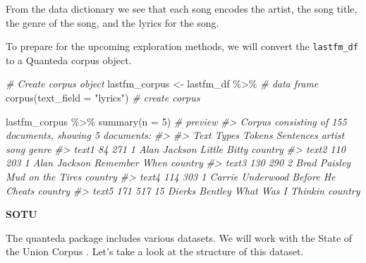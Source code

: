 \documentclass[
]{article}
\newenvironment{Shaded}{\begin{snugshade}}{\end{snugshade}}
\newcommand{\AttributeTok}[1]{\textcolor[rgb]{0.77,0.63,0.00}{#1}}
\newcommand{\CommentTok}[1]{\textcolor[rgb]{0.56,0.35,0.01}{\textit{#1}}}
\newcommand{\DecValTok}[1]{\textcolor[rgb]{0.00,0.00,0.81}{#1}}
\newcommand{\FunctionTok}[1]{\textcolor[rgb]{0.00,0.00,0.00}{#1}}
\newcommand{\NormalTok}[1]{#1}
\newcommand{\OtherTok}[1]{\textcolor[rgb]{0.56,0.35,0.01}{#1}}
\newcommand{\SpecialCharTok}[1]{\textcolor[rgb]{0.00,0.00,0.00}{#1}}
\newcommand{\StringTok}[1]{\textcolor[rgb]{0.31,0.60,0.02}{#1}}
\begin{document}
From the data dictionary we see that each song encodes the artist, the song title, the genre of the song, and the lyrics for the song.

To prepare for the upcoming exploration methods, we will convert the \texttt{lastfm\_df} to a Quanteda corpus object.

\begin{Shaded}
\begin{Highlighting}[]
\CommentTok{\# Create corpus object}
\NormalTok{lastfm\_corpus }\OtherTok{\textless{}{-}} 
\NormalTok{  lastfm\_df }\SpecialCharTok{\%\textgreater{}\%} \CommentTok{\# data frame}
  \FunctionTok{corpus}\NormalTok{(}\AttributeTok{text\_field =} \StringTok{"lyrics"}\NormalTok{) }\CommentTok{\# create corpus}

\NormalTok{lastfm\_corpus }\SpecialCharTok{\%\textgreater{}\%} 
  \FunctionTok{summary}\NormalTok{(}\AttributeTok{n =} \DecValTok{5}\NormalTok{) }\CommentTok{\# preview}
\CommentTok{\#\textgreater{} Corpus consisting of 155 documents, showing 5 documents:}
\CommentTok{\#\textgreater{} }
\CommentTok{\#\textgreater{}   Text Types Tokens Sentences           artist                song   genre}
\CommentTok{\#\textgreater{}  text1    84    271         1     Alan Jackson        Little Bitty country}
\CommentTok{\#\textgreater{}  text2   110    203         1     Alan Jackson       Remember When country}
\CommentTok{\#\textgreater{}  text3   130    290         2     Brad Paisley    Mud on the Tires country}
\CommentTok{\#\textgreater{}  text4   114    303         1 Carrie Underwood    Before He Cheats country}
\CommentTok{\#\textgreater{}  text5   171    517        15   Dierks Bentley What Was I Thinkin\textquotesingle{} country}
\end{Highlighting}
\end{Shaded}

\textbf{SOTU}

The quanteda package \citep{R-quanteda} includes various datasets. We will work with the State of the Union Corpus \citep{R-quanteda.corpora}. Let's take a look at the structure of this dataset.

\begin{Shaded}
\end{Shaded}
\end{document}
